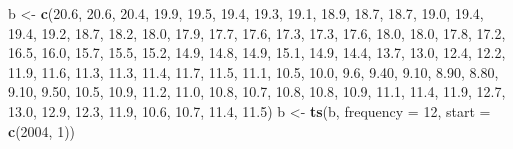 \documentclass[polish,]{book}
\newenvironment{Shaded}{\begin{snugshade}}{\end{snugshade}}
\newcommand{\DataTypeTok}[1]{\textcolor[rgb]{0.13,0.29,0.53}{#1}}
\newcommand{\DecValTok}[1]{\textcolor[rgb]{0.00,0.00,0.81}{#1}}
\newcommand{\FloatTok}[1]{\textcolor[rgb]{0.00,0.00,0.81}{#1}}
\newcommand{\KeywordTok}[1]{\textcolor[rgb]{0.13,0.29,0.53}{\textbf{#1}}}
\newcommand{\NormalTok}[1]{#1}
\newcommand{\StringTok}[1]{\textcolor[rgb]{0.31,0.60,0.02}{#1}}
\begin{document}
\begin{Shaded}
\begin{Highlighting}[]
\NormalTok{b <-}\StringTok{ }\KeywordTok{c}\NormalTok{(}\FloatTok{20.6}\NormalTok{, }\FloatTok{20.6}\NormalTok{, }\FloatTok{20.4}\NormalTok{, }\FloatTok{19.9}\NormalTok{, }\FloatTok{19.5}\NormalTok{, }\FloatTok{19.4}\NormalTok{, }\FloatTok{19.3}\NormalTok{, }\FloatTok{19.1}\NormalTok{, }\FloatTok{18.9}\NormalTok{, }\FloatTok{18.7}\NormalTok{, }\FloatTok{18.7}\NormalTok{, }\FloatTok{19.0}\NormalTok{, }\FloatTok{19.4}\NormalTok{, }\FloatTok{19.4}\NormalTok{, }
       \FloatTok{19.2}\NormalTok{, }\FloatTok{18.7}\NormalTok{, }\FloatTok{18.2}\NormalTok{, }\FloatTok{18.0}\NormalTok{, }\FloatTok{17.9}\NormalTok{, }\FloatTok{17.7}\NormalTok{, }\FloatTok{17.6}\NormalTok{, }\FloatTok{17.3}\NormalTok{, }\FloatTok{17.3}\NormalTok{, }\FloatTok{17.6}\NormalTok{, }\FloatTok{18.0}\NormalTok{, }\FloatTok{18.0}\NormalTok{, }\FloatTok{17.8}\NormalTok{, }\FloatTok{17.2}\NormalTok{,}
       \FloatTok{16.5}\NormalTok{, }\FloatTok{16.0}\NormalTok{, }\FloatTok{15.7}\NormalTok{, }\FloatTok{15.5}\NormalTok{, }\FloatTok{15.2}\NormalTok{, }\FloatTok{14.9}\NormalTok{, }\FloatTok{14.8}\NormalTok{, }\FloatTok{14.9}\NormalTok{, }\FloatTok{15.1}\NormalTok{, }\FloatTok{14.9}\NormalTok{, }\FloatTok{14.4}\NormalTok{, }\FloatTok{13.7}\NormalTok{, }\FloatTok{13.0}\NormalTok{, }\FloatTok{12.4}\NormalTok{,}
       \FloatTok{12.2}\NormalTok{, }\FloatTok{11.9}\NormalTok{, }\FloatTok{11.6}\NormalTok{, }\FloatTok{11.3}\NormalTok{, }\FloatTok{11.3}\NormalTok{, }\FloatTok{11.4}\NormalTok{, }\FloatTok{11.7}\NormalTok{, }\FloatTok{11.5}\NormalTok{, }\FloatTok{11.1}\NormalTok{, }\FloatTok{10.5}\NormalTok{, }\FloatTok{10.0}\NormalTok{, }\FloatTok{9.6}\NormalTok{,  }\FloatTok{9.40}\NormalTok{, }\FloatTok{9.10}\NormalTok{,}
       \FloatTok{8.90}\NormalTok{, }\FloatTok{8.80}\NormalTok{, }\FloatTok{9.10}\NormalTok{, }\FloatTok{9.50}\NormalTok{, }\FloatTok{10.5}\NormalTok{, }\FloatTok{10.9}\NormalTok{, }\FloatTok{11.2}\NormalTok{, }\FloatTok{11.0}\NormalTok{, }\FloatTok{10.8}\NormalTok{, }\FloatTok{10.7}\NormalTok{, }\FloatTok{10.8}\NormalTok{, }\FloatTok{10.8}\NormalTok{, }\FloatTok{10.9}\NormalTok{, }\FloatTok{11.1}\NormalTok{,}
       \FloatTok{11.4}\NormalTok{, }\FloatTok{11.9}\NormalTok{, }\FloatTok{12.7}\NormalTok{, }\FloatTok{13.0}\NormalTok{, }\FloatTok{12.9}\NormalTok{, }\FloatTok{12.3}\NormalTok{, }\FloatTok{11.9}\NormalTok{, }\FloatTok{10.6}\NormalTok{, }\FloatTok{10.7}\NormalTok{, }\FloatTok{11.4}\NormalTok{, }\FloatTok{11.5}\NormalTok{)}
\NormalTok{b <-}\StringTok{ }\KeywordTok{ts}\NormalTok{(b, }\DataTypeTok{frequency =} \DecValTok{12}\NormalTok{, }\DataTypeTok{start =} \KeywordTok{c}\NormalTok{(}\DecValTok{2004}\NormalTok{, }\DecValTok{1}\NormalTok{))}
\end{Highlighting}
\end{Shaded}
\end{document}
